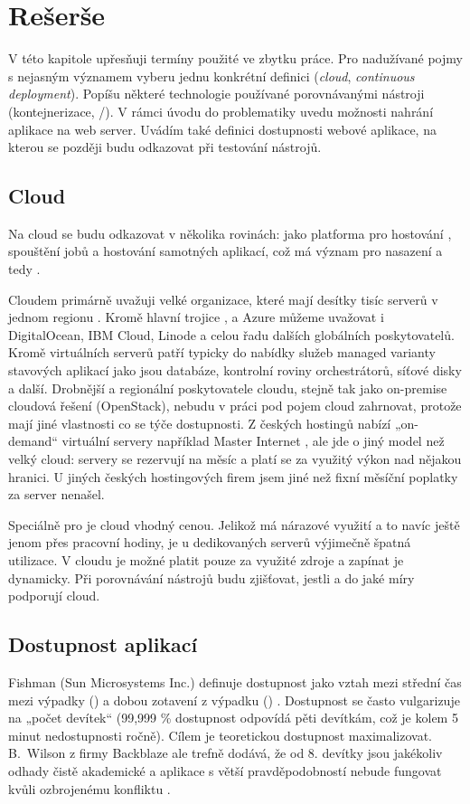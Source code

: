 \chapter{Rešerše}
    V této kapitole upřesňuji termíny použité ve zbytku práce. Pro nadužívané pojmy s nejasným významem vyberu jednu konkrétní definici (\textit{cloud}, \textit{continuous deployment}). Popíšu některé technologie používané porovnávanými \CI nástroji (kontejnerizace, /). V rámci úvodu do problematiky \CICD uvedu možnosti nahrání aplikace na web server. Uvádím také definici dostupnosti webové aplikace, na kterou se později budu odkazovat při testování \CICD nástrojů.

    \section{Cloud}
        Na cloud se budu odkazovat v několika rovinách: jako platforma pro hostování \CI, spouštění jobů a hostování samotných aplikací, což má význam pro nasazení a tedy \CD.

        Cloudem primárně uvažuji velké organizace, které mají desítky tisíc serverů v jednom regionu \cite{pier-cloud}. Kromě hlavní trojice ,  a Azure můžeme uvažovat i DigitalOcean, IBM Cloud, Linode a celou řadu dalších globálních poskytovatelů. Kromě virtuálních serverů patří typicky do nabídky služeb managed varianty stavových aplikací jako jsou databáze, kontrolní roviny orchestrátorů, síťové disky a další. Drobnější a regionální poskytovatele cloudu, stejně tak jako on-premise cloudová řešení (OpenStack), nebudu v práci pod pojem cloud zahrnovat, protože mají jiné vlastnosti co se týče dostupnosti. Z českých hostingů nabízí „on-demand“ virtuální servery například Master Internet \cite{master-pricing}, ale jde o jiný model než velký cloud: servery se rezervují na měsíc a platí se za využitý výkon nad nějakou hranici. U jiných českých hostingových firem jsem jiné než fixní měsíční poplatky za server nenašel.

        Speciálně pro \CI je cloud vhodný cenou. Jelikož \CI má nárazové využití a to navíc ještě jenom přes pracovní hodiny, je u dedikovaných serverů výjimečně špatná utilizace. V cloudu je možné platit pouze za využité zdroje a zapínat je dynamicky. Při porovnávání \CI nástrojů budu zjišťovat, jestli a do jaké míry podporují cloud.

    \section{Dostupnost aplikací}
        Fishman (Sun Microsystems Inc.) definuje dostupnost jako vztah mezi střední čas mezi výpadky () a dobou zotavení z výpadku () \cite{fishman-availability}. Dostupnost se často vulgarizuje na „počet devítek“ (99,999 \% dostupnost odpovídá pěti devítkám, což je kolem 5 minut nedostupnosti ročně). Cílem je teoretickou dostupnost maximalizovat. B.~Wilson z firmy Backblaze ale trefně dodává, že od 8. devítky jsou jakékoliv odhady čistě akademické a aplikace s větší pravděpodobností nebude fungovat kvůli ozbrojenému konfliktu \cite{backblaze-availability}.

